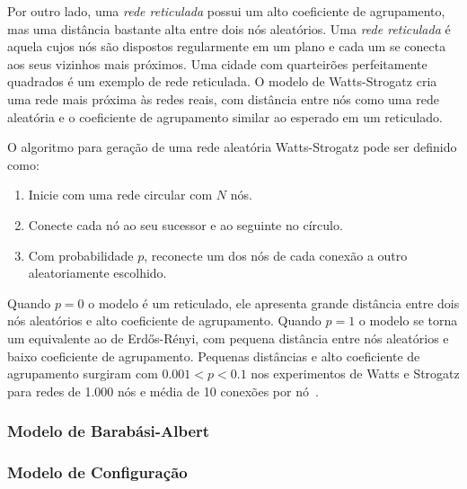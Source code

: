 \documentclass[12pt,a4paper]{article}
\theoremstyle{hypo}
\begin{document}

Por outro lado, uma \textit{rede reticulada} possui um alto coeficiente de agrupamento, mas uma distância bastante alta entre dois nós aleatórios. Uma \textit{rede reticulada} é aquela cujos nós são dispostos regularmente em um plano e cada um se conecta aos seus vizinhos mais próximos. Uma cidade com quarteirões perfeitamente quadrados é um exemplo de rede reticulada. O modelo de Watts-Strogatz cria uma rede mais próxima às redes reais, com distância entre nós como uma rede aleatória e o coeficiente de agrupamento similar ao esperado em um reticulado.

O algoritmo para geração de uma rede aleatória Watts-Strogatz pode ser definido como:

\begin{enumerate}
\item Inicie com uma rede circular com $N$ nós.

\item Conecte cada nó ao seu sucessor e ao seguinte no círculo.

\item Com probabilidade $p$, reconecte um dos nós de cada conexão a outro aleatoriamente escolhido.
\end{enumerate}

Quando $p = 0$ o modelo é um reticulado, ele apresenta grande distância entre dois nós aleatórios e alto coeficiente de agrupamento. Quando $p = 1$ o modelo se torna um equivalente ao de Erdős-Rényi, com pequena distância entre nós aleatórios e baixo coeficiente de agrupamento. Pequenas distâncias e alto coeficiente de agrupamento surgiram com $0.001 < p < 0.1$ nos experimentos de Watts e Strogatz para redes de 1.000 nós e média de 10 conexões por nó~\cite{Watts1998-wt}.

\subsubsection{Modelo de Barabási-Albert} \label{sec:modelo-barabasi-albert}

\subsubsection{Modelo de Configuração} \label{sec:modelo-configuracao}
\end{document}
